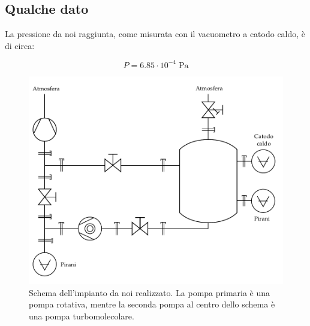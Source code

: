 \subsection{Qualche dato}

La pressione da noi raggiunta, come misurata con il vacuometro a catodo caldo, è di circa:

\begin{equation}
    P = 6.85 \cdot 10^{-4} \; \si{\pascal}
\end{equation}

\begin{figure}[b!]
    \centering
   \includegraphics[width=16cm]{drawing.pdf}
   \caption{Schema dell'impianto da noi realizzato. La pompa primaria è una pompa rotativa, mentre la seconda pompa al centro dello schema
   è una pompa turbomolecolare.}
   \label{fig:schema}
\end{figure}

